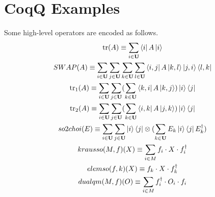 \documentclass[manuscript, review, timestamp]{acmart}
\newcommand{\tr}{\mathrm{tr}}
\begin{document}
\section{CoqQ Examples}
\begin{definition}
  Some high-level operators are encoded as follows.  
  \begin{gather*}
    \tr(A) \equiv \sum_{i\in\mathbf{U}} \bra{i} A \ket{i} \\
    SWAP(A) \equiv \sum_{i\in\mathbf{U}}\sum_{j\in\mathbf{U}}\sum_{k\in\mathbf{U}}\sum_{l\in\mathbf{U}} \bra{i, j} A \ket{k, l} \ket{j, i}\bra{l, k} \\
    \tr_1(A) \equiv \sum_{i\in\mathbf{U}}\sum_{j\in\mathbf{U}} (\sum_{k\in\mathbf{U}} \bra{k, i} A \ket{k, j}) \ket{i}\bra{j} \\
    \tr_2(A) \equiv \sum_{i\in\mathbf{U}}\sum_{j\in\mathbf{U}} (\sum_{k\in\mathbf{U}} \bra{i, k} A \ket{j, k}) \ket{i}\bra{j} \\
    so2choi(E) \equiv \sum_{i\in\mathbf{U}}\sum_{j\in\mathbf{U}} \ket{i}\bra{j} \otimes (\sum_{k\in\mathbf{U}} E_k \ket{i}\bra{j} E_k^\dagger) \\
    krausso(M, f)(X) \equiv \sum_{i \in M} f_i \cdot X \cdot f_i^\dagger \\
    elemso(f, k)(X) \equiv f_k \cdot X \cdot f_k^\dagger \\
    dualqm(M, f)(O) \equiv \sum_{i\in M} f_i^\dagger \cdot O_i \cdot f_i
  \end{gather*}
\end{definition}
\end{document}
